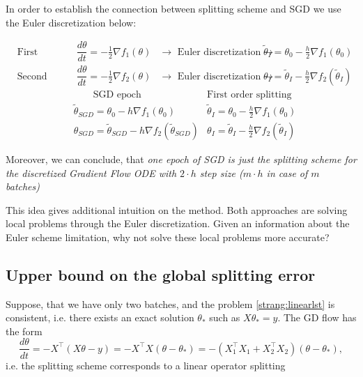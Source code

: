 \documentclass{article} %
\begin{document}
In order to establish the connection between splitting scheme and SGD we use the Euler discretization below:

\begin{align*}
&\text{First splitting step: } &\dfrac{d \theta}{d t} = -\frac{1}{2}\nabla f_1(\theta)  &\to\text{ Euler discretization}\to &\tilde{\theta}_{I} = \theta_0 - \frac{h}{2}\nabla f_1 (\theta_0) \\
&\text{Second splitting step: } &\dfrac{d \theta}{d t} = -\frac{1}{2}\nabla f_2(\theta)  &\to\text{ Euler discretization}\to &\theta_{I} = \tilde{\theta}_{I} - \frac{h}{2}\nabla f_2 (\tilde{\theta}_{I})
\end{align*}
\begin{align*}
&\qquad\text{SGD epoch} &\text{First order splitting} \\
&\tilde{\theta}_{SGD} = \theta_0 - h \nabla f_1 (\theta_0) &\tilde{\theta}_{I} = \theta_0 - \frac{h}{2}\nabla f_1 (\theta_0) \\
&\theta_{SGD} = \tilde{\theta}_{SGD} - h \nabla f_2 (\tilde{\theta}_{SGD}) &\theta_{I} = \tilde{\theta}_{I} - \frac{h}{2}\nabla f_2 (\tilde{\theta}_{I})
\end{align*}

Moreover, we can conclude, that \textit{one epoch of SGD is just the splitting scheme for the discretized Gradient Flow ODE with $2 \cdot h$ step size ($m \cdot h$ in case of $m$ batches)}

This idea gives additional intuition on the method. Both approaches are solving local problems through the Euler discretization. Given an information about the Euler scheme limitation, why not solve these local problems more accurate?

\subsection{Upper bound on the global splitting error}

Suppose, that we have only two batches, and the problem \eqref{strang:linearlst} is consistent, i.e. there exists an exact solution $\theta_*$ such as $X \theta_* = y$. The GD flow has the form
\begin{equation}\label{strang:model1}
    \frac{d \theta}{d t} = -X^{\top} (X \theta - y) = -X^{\top} X(\theta - \theta_*) = -(X_1^{\top} X_1 + X^{\top}_2 X_2)(\theta - \theta_*),
\end{equation}
i.e. the splitting scheme corresponds to a linear operator splitting
\end{document}

